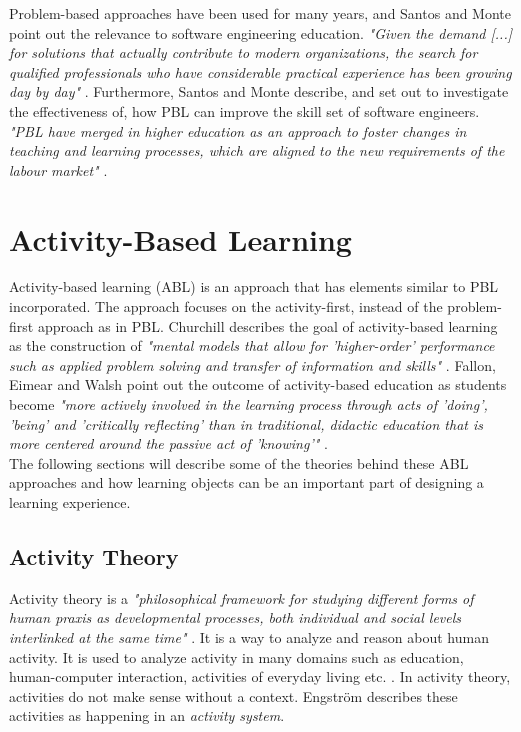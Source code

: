 \noindent
Problem-based approaches have been used for many years, and Santos and Monte point out the relevance to software engineering education. 
\textit{"Given the demand [...] for solutions that actually contribute to modern organizations, the search for qualified professionals who have considerable practical experience has been growing day by day"} \cite[p. 1]{santos2013pbl}. Furthermore, Santos and Monte describe, and set out to investigate the effectiveness of, how PBL can improve the skill set of software engineers.
\textit{"PBL have merged in higher education as an approach to foster changes in teaching and learning processes, which are aligned to the new requirements of the labour market"} \cite[p. 1]{santos2013pbl}.


\section{Activity-Based Learning}

Activity-based learning (ABL) is an approach that has elements similar to PBL incorporated. The approach focuses on the activity-first, instead of the problem-first approach as in PBL. Churchill describes the goal of activity-based learning as the construction of \textit{"mental models that allow for 'higher-order' performance such as applied problem solving and transfer of information and skills"} \cite[p. 1]{churchill2003effective}. Fallon, Eimear and Walsh point out the outcome of activity-based education as students become \textit{"more actively involved in the learning process through acts of 'doing', 'being' and 'critically reflecting' than in traditional, didactic education that is more centered around the passive act of 'knowing'"} \cite[p. 4-5]{fallon2013activity}. \\

\noindent The following sections will describe some of the theories behind these ABL approaches and how learning objects can be an important part of designing a learning experience.


\subsection*{Activity Theory}
Activity theory is a \textit{"philosophical framework for studying different forms of human praxis as developmental processes, both individual and social levels interlinked at the same time"} \cite[p. 62]{jonassen1999activitytheory}. It is a way to analyze and reason about human activity. It is used to analyze activity in many domains such as education, human-computer interaction, activities of everyday living etc. \cite[p. 62]{jonassen1999activitytheory}. In activity theory, activities do not make sense without a context. Engström describes these activities as happening in an \textit{activity system}. 

